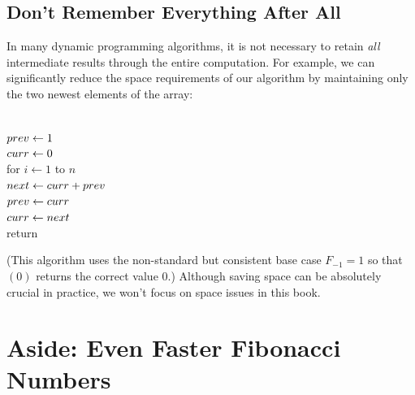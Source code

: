 \subsection{Don't Remember Everything After All}

In many dynamic programming algorithms, it is not necessary to retain \textit{all} intermediate results through the entire computation.
For example, we can significantly reduce the space requirements of our algorithm  by maintaining only the two newest elements of the array:

\begin{pseudocode}
\\
$prev \gets 1$\\
$curr \gets 0$\\
for $i \gets 1$ to $n$\\
\Indent $next \gets curr + prev$\\
\Indent $prev \gets curr$\\
\Indent $curr \gets next$\\
return 
\end{pseudocode}

(This algorithm uses the non-standard but consistent base case $F_{-1} = 1$ so that $(0)$ returns the correct value $0$.)
Although saving space can be absolutely crucial in practice, we won’t focus on space issues in this book.

\section{Aside: Even Faster Fibonacci Numbers}
\label{sec:3.2}

